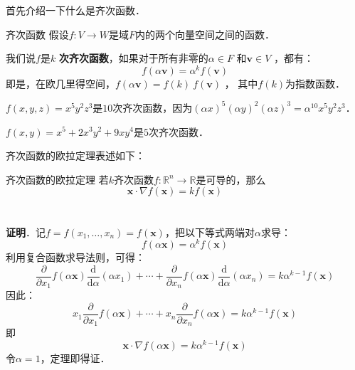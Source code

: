 

首先介绍一下什么是齐次函数．

\begin{definition}{齐次函数}
假设$f: V \to W $是域$ F $内的两个向量空间之间的函数．

我们说$f$是$k$ \textbf{次齐次函数}，如果对于所有非零的$\alpha \in F$ 和$\mathbf{v} \in V$ ，都有：
\begin{equation}
f(\alpha \mathbf{v}) = \alpha^k f(\mathbf{v}) 
\end{equation}
即是，在欧几里得空间，$f(\alpha \mathbf{v}) = f(k) \ f(\mathbf{v})$ ， 其中$f(k)$为指数函数．
\end{definition}

\begin{example}{}
$f(x,y,z)=x^5y^2z^3$是$10$次齐次函数，因为$(\alpha x)^5(\alpha y)^2(\alpha z)^3=\alpha^{10}x^5y^2z^3$．

$f(x,y)=x^5 + 2 x^3 y^2 + 9 x y^4$是$5$次齐次函数．
\end{example}

齐次函数的欧拉定理表述如下：

\begin{theorem}{齐次函数的欧拉定理}
若$k$齐次函数$ f:\mathbb{R}^n \to \mathbb{R}$是可导的，那么
\begin{equation}
{\displaystyle \mathbf {x} \cdot \nabla f(\mathbf {x} )=kf(\mathbf {x} )\qquad }
\end{equation}
\\
\\
\textbf{证明}．记$f=f(x_{1},\ldots ,x_{n})=f(\mathbf {x} )$，把以下等式两端对$\alpha$求导：
\begin{equation}
{\displaystyle f(\alpha \mathbf {x} )=\alpha ^{k}f(\mathbf {x} )}
\end{equation}
利用复合函数求导法则，可得：
\begin{equation}
{\frac {\partial }{\partial x_{1}}}f(\alpha \mathbf {x} ){\frac {\mathrm {d} }{\mathrm {d} \alpha }}(\alpha x_{1})+\cdots +{\frac {\partial }{\partial x_{n}}}f(\alpha \mathbf {x} ){\frac {\mathrm {d} }{\mathrm {d} \alpha }}(\alpha x_{n})=k\alpha ^{k-1}f(\mathbf {x} )
\end{equation}
因此：
\begin{equation}
x_{1}{\frac {\partial }{\partial x_{1}}}f(\alpha \mathbf {x} )+\cdots +x_{n}{\frac {\partial }{\partial x_{n}}}f(\alpha \mathbf {x} )=k\alpha ^{k-1}f(\mathbf {x} )
\end{equation}
即
\begin{equation}
\mathbf {x} \cdot \nabla f(\alpha \mathbf {x} )=k\alpha ^{k-1}f(\mathbf {x} )
\end{equation}
令$\alpha=1$，定理即得证．
\end{theorem}

